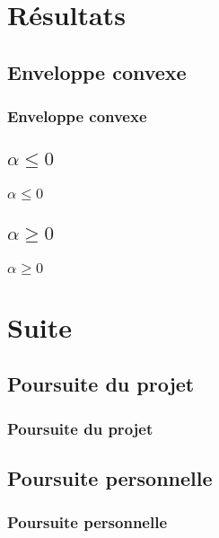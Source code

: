 \documentclass{beamer}
\begin{document}
\section{Résultats}

\subsection{Enveloppe convexe}
\begin{frame}
\frametitle{Enveloppe convexe}
\end{frame}

\subsection{$\alpha \leq 0$}
\begin{frame}
\frametitle{$\alpha \leq 0$}
\end{frame}

\subsection{$\alpha \geq 0$}
\begin{frame}
\frametitle{$\alpha \geq 0$}
\end{frame}

\section{Suite}

\subsection{Poursuite du projet}
\begin{frame}
\frametitle{Poursuite du projet}
\end{frame}

\subsection{Poursuite personnelle}
\begin{frame}
\frametitle{Poursuite personnelle}
\end{frame}

\end{document}

